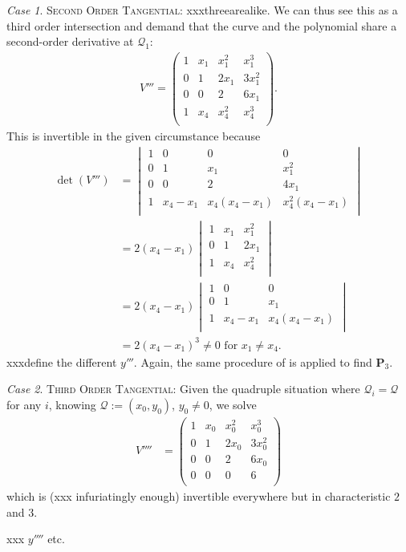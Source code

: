 \documentclass[english,11pt,a4paper]{article}
\theoremstyle{definition}
\theoremstyle{remark}
\theoremstyle{case}
\newtheorem{case}{Case}
\renewcommand{\P}{\mathbf{P}}
\newcommand{\q}{\mathcal{Q}}
\begin{document}
\begin{case}
	{\scshape Second Order Tangential:} xxxthreearealike. We can thus see this as a third order intersection and demand that the curve and the polynomial share a second-order derivative at $\q_1$:
	\begin{align*}V'''=
			\begin{pmatrix}
			1 & x_1 & x_1^2 & x_1^3\\
			0 & 1 & 2 x_1 & 3 x_1^2\\
			0 & 0 & 2 & 6x_1\\
			1 & x_4 & x_4^2 & x_4^3\\
		\end{pmatrix}.
	\end{align*}	
	This is invertible in the given circumstance because
	\begin{align*}\det (V''') &=
		\begin{vmatrix}
			1 & 0 & 0 & 0\\
			0 & 1 & x_1 & x_1^2\\
			0 & 0 & 2 & 4x_1\\
			1 & x_4-x_1 & x_4(x_4-x_1) & x_4^2(x_4-x_1)\\
		\end{vmatrix}
		\\
		&= 2 (x_4-x_1)
		\begin{vmatrix}
			1 & x_1 & x_1^2\\
			0 & 1 & 2x_1\\
			1 & x_4 & x_4^2\\
		\end{vmatrix}
		\\
		&= 2 (x_4-x_1)
		\begin{vmatrix}
			1 & 0 & 0\\
			0 & 1 & x_1\\
			1 & x_4-x_1 & x_4(x_4-x_1)\\
		\end{vmatrix}
		\\
		&= 2 (x_4-x_1)^3 \neq 0 \text{ for } x_1\neq x_4.
	\end{align*}
	xxxdefine the different $y'''$. Again, the same procedure of is applied to find $\P_3$.
\end{case}

\begin{case}
	{\scshape Third Order Tangential:} Given the quadruple situation where $\q_i = \q$ for any $i$, knowing $\q := (x_0,y_0)$, $y_0 \neq 0$, we solve
	\begin{align*}V'''' &=
		\begin{pmatrix}
			1 & x_0 & x_0^2 & x_0^3\\
			0 & 1 & 2 x_0 & 3 x_0^2\\
			0 & 0 & 2 & 6x_0\\
			0 & 0 & 0 & 6\\
		\end{pmatrix}
	\end{align*}
	which is (xxx infuriatingly enough) invertible everywhere but in characteristic $2$ and $3$.

	xxx $y''''$ etc.
\end{case}
\end{document}
